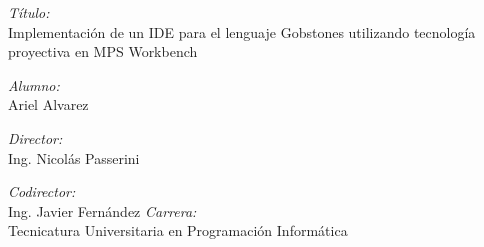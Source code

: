 \Large \emph{Título:}\\
Implementación de un IDE para el lenguaje Gobstones utilizando tecnología proyectiva en MPS Workbench
\bigskip

\Large \emph{Alumno:}\\
Ariel Alvarez
\bigskip

\Large \emph{Director:}\\
Ing. Nicolás Passerini
\bigskip

\Large \emph{Codirector:}\\
Ing. Javier Fernández
\bigskip
\underline{}
\Large \emph{Carrera:}\\
Tecnicatura Universitaria en Programación Informática
